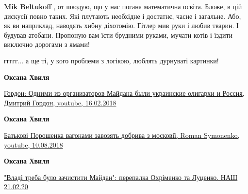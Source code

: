 \begin{itemize}
\begin{itemize}
\textbf{Mik Beltukoff} , от шкодую, що у нас погана математична освіта. Бложе,
в цій дискусії повно таких. Які плутають необхідне і достатнє, часне і
загальне. Або, як ви наприклад, наводять хибну діхотомію. Гітлер мив руки і
любив тварин. І будував атобани. Пропоную вам їсти брудними руками, мучати
котів і їздити виключно дорогами з ямами!

 
ггггг... а ще ті, у кого проблеми з логікою, люблять дурнуваті картинки!

 
\textbf{Оксана Хвиля}

\href{https://www.youtube.com/watch?v=7za1qEbrrLQ}{%
Гордон: Одними из организаторов Майдана были украинские олигархи и Россия, Дмитрий Гордон, youtube, 16.02.2018%
}

 
\textbf{Оксана Хвиля}

\href{https://www.youtube.com/watch?v=l9F7ZCXLinQ}{%
Батькові Порошенка вагонами завозять добрива з московії, Roman Symonenko, youtube, 10.08.2018%
}

 
\textbf{Оксана Хвиля} 

\href{https://youtu.be/bDQeGlvCGQs}{%
"Владі треба було зачистити Майдан": перепалка Охріменко та Луценко. НАШ 21.02.20%
}

 

\end{itemize}
\end{itemize}
